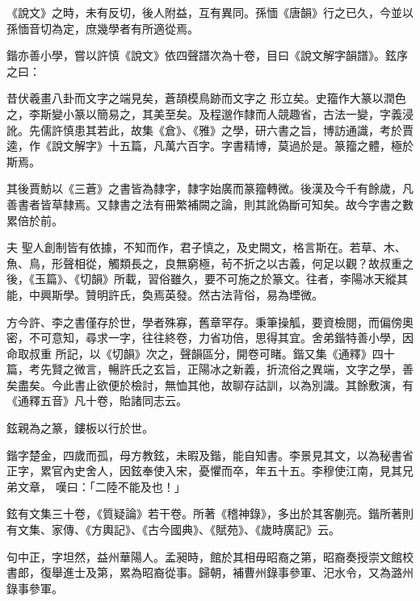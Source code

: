 \begin{pinyinscope}
 《說文》之時，未有反切，後人附益，互有異同。孫愐《唐韻》行之已久，今並以孫愐音切為定，庶幾學者有所適從焉。



 鍇亦善小學，嘗以許慎《說文》依四聲譜次為十卷，目曰《說文解字韻譜》。鉉序之曰：



 昔伏羲畫八卦而文字之端見矣，蒼頡模鳥跡而文字之
 形立矣。史籀作大篆以潤色之，李斯變小篆以簡易之，其美至矣。及程邈作隸而人競趣省，古法一變，字義浸訛。先儒許慎患其若此，故集《倉》、《雅》之學，研六書之旨，博訪通識，考於賈逵，作《說文解字》十五篇，凡萬六百字。字書精博，莫過於是。篆籀之體，極於斯焉。



 其後賈魴以《三蒼》之書皆為隸字，隸字始廣而篆籀轉微。後漢及今千有餘歲，凡善書者皆草隸焉。又隸書之法有冊繁補闕之論，則其訛偽斷可知矣。故今字書之數累倍於前。



 夫
 聖人創制皆有依據，不知而作，君子慎之，及史闕文，格言斯在。若草、木、魚、鳥，形聲相從，觸類長之，良無窮極，茍不折之以古義，何足以觀？故叔重之後，《玉篇》、《切韻》所載，習俗雖久，要不可施之於篆文。往者，李陽冰天縱其能，中興斯學。贊明許氏，奐焉英發。然古法背俗，易為堙微。



 方今許、李之書僅存於世，學者殊寡，舊章罕存。秉筆操觚，要資檢閱，而偏傍奧密，不可意知，尋求一字，往往終卷，力省功倍，思得其宜。舍弟鍇特善小學，因命取叔重
 所記，以《切韻》次之，聲韻區分，開卷可睹。鍇又集《通釋》四十篇，考先賢之微言，暢許氏之玄旨，正陽冰之新義，折流俗之異端，文字之學，善矣盡矣。今此書止欲便於檢討，無恤其他，故聊存詁訓，以為別識。其餘敷演，有《通釋五音》凡十卷，貽諸同志云。



 鉉親為之篆，鏤板以行於世。



 鍇字楚金，四歲而孤，母方教鉉，未暇及鍇，能自知書。李景見其文，以為秘書省正字，累官內史舍人，因鉉奉使入宋，憂懼而卒，年五十五。李穆使江南，見其兄弟文章，
 嘆曰：「二陸不能及也！」



 鉉有文集三十卷，《質疑論》若干卷。所著《稽神錄》，多出於其客蒯亮。鍇所著則有文集、家傳、《方輿記》、《古今國典》、《賦苑》、《歲時廣記》云。



 句中正，字坦然，益州華陽人。孟昶時，館於其相毋昭裔之第，昭裔奏授崇文館校書郎，復舉進士及第，累為昭裔從事。歸朝，補曹州錄事參軍、汜水令，又為潞州錄事參軍。




\end{pinyinscope}
